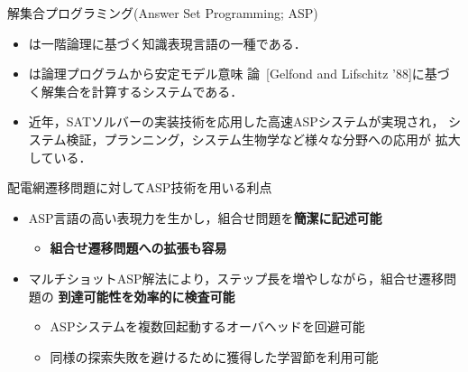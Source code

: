 \documentclass[dvipdfmx,11pt]{beamer}
\begin{document}
\begin{frame}{解集合プログラミング(Answer Set Programming; ASP)}
\vfill
 \begin{itemize}
  \item {}は一階論理に基づく知識表現言語の一種である．
  \item {}は論理プログラムから安定モデル意味
        論~[Gelfond and Lifschitz '88]に基づく解集合を計算するシステムである．
  \item 近年，SATソルバーの実装技術を応用した高速ASPシステムが実現され，
        システム検証，プランニング，システム生物学など様々な分野への応用が
        拡大している．
 \end{itemize}
 \vfill
 \begin{alertblock}{配電網遷移問題に対してASP技術を用いる利点}
  \begin{itemize}
   \item ASP言語の高い表現力を生かし，組合せ問題を\textbf{簡潔に記述可能}
         \begin{itemize}
          \item \alert{\bf 組合せ遷移問題への拡張も容易}
         \end{itemize}
   \item マルチショットASP解法により，ステップ長を増やしながら，組合せ遷移問題の
         \alert{\bf 到達可能性を効率的に検査可能}
         \begin{itemize}
          \item ASPシステムを複数回起動するオーバヘッドを回避可能
          \item 同様の探索失敗を避けるために獲得した学習節を利用可能
         \end{itemize}
  \end{itemize}
 \end{alertblock} \vfill
\end{frame}
\end{document}
